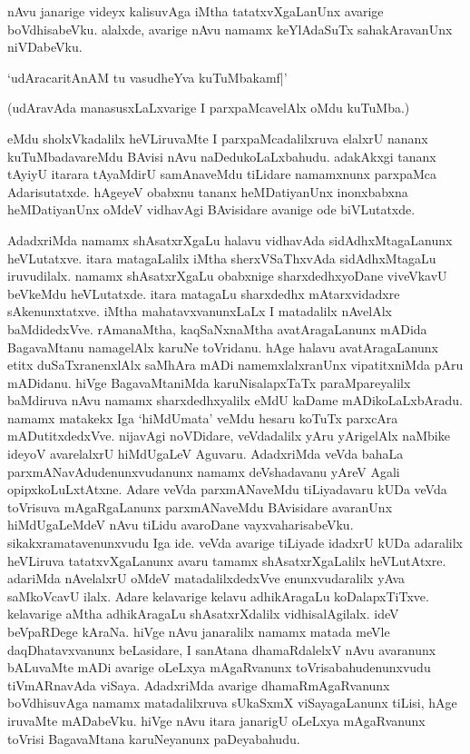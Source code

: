 nAvu janarige videyx kalisuvAga iMtha tatatxvXgaLanUnx avarige boVdhisabeVku. alalxde, avarige nAvu namamx keYlAdaSuTx sahakAravanUnx niVDabeVku.

\begin{shloka}
`udAracaritAnAM tu vasudheYva kuTuMbakamf|'
\end{shloka}

(udAravAda manasusxLaLxvarige I parxpaMcavelAlx oMdu kuTuMba.)

eMdu sholxVkadalilx heVLiruvaMte I parxpaMcadalilxruva elalxrU nananx kuTuMbadavareMdu BAvisi nAvu naDedukoLaLxbahudu. adakAkxgi tananx tAyiyU itarara tAyaMdirU samAnaveMdu tiLidare namamxnunx parxpaMca Adarisutatxde. hAgeyeV obabxnu tananx heMDatiyanUnx inonxbabxna heMDatiyanUnx oMdeV vidhavAgi BAvisidare avanige ode biVLutatxde.

AdadxriMda namamx shAsatxrXgaLu halavu vidhavAda sidAdhxMtagaLanunx heVLutatxve. itara matagaLalilx iMtha sherxVSaThxvAda sidAdhxMtagaLu iruvudilalx. namamx shAsatxrXgaLu obabxnige sharxdedhxyoDane viveVkavU beVkeMdu heVLutatxde. itara matagaLu sharxdedhx mAtarxvidadxre sAkenunxtatxve. iMtha mahatavxvanunxLaLx I matadalilx nAvelAlx baMdidedxVve. rAmanaMtha, kaqSaNxnaMtha avatAragaLanunx mADida BagavaMtanu namagelAlx karuNe toVridanu. hAge halavu avatAragaLanunx etitx duSaTxranenxlAlx saMhAra mADi namemxlalxranUnx 
vipatitxniMda pAru mADidanu. hiVge BagavaMtaniMda karuNisalapxTaTx paraMpareyalilx baMdiruva nAvu namamx sharxdedhxyalilx eMdU kaDame mADikoLaLxbAradu. namamx matakekx Iga `hiMdUmata' veMdu hesaru koTuTx parxcAra mADutitxdedxVve. nijavAgi noVDidare, veVdadalilx yAru yArigelAlx naMbike ideyoV avarelalxrU hiMdUgaLeV Aguvaru. AdadxriMda veVda bahaLa parxmANavAdudenunxvudanunx namamx deVshadavanu yAreV Agali opipxkoLuLxtAtxne. Adare veVda parxmANaveMdu tiLiyadavaru kUDa veVda toVrisuva mAgaRgaLanunx parxmANaveMdu BAvisidare 
avaranUnx hiMdUgaLeMdeV nAvu tiLidu avaroDane vayxvaharisabeVku. sikakxramatavenunxvudu Iga ide. veVda avarige tiLiyade idadxrU kUDa adaralilx heVLiruva tatatxvXgaLanunx avaru tamamx shAsatxrXgaLalilx heVLutAtxre. adariMda nAvelalxrU oMdeV matadalilxdedxVve enunxvudaralilx yAva saMkoVcavU ilalx. Adare kelavarige kelavu adhikAragaLu koDalapxTiTxve. kelavarige aMtha adhikAragaLu shAsatxrXdalilx vidhisalAgilalx. ideV beVpaRDege kAraNa. hiVge nAvu janaralilx namamx matada meVle daqDhatavxvanunx beLasidare, I sanAtana 
dhamaRdalelxV nAvu avaranunx bALuvaMte mADi avarige oLeLxya mAgaRvanunx toVrisabahudenunxvudu tiVmARnavAda viSaya. AdadxriMda avarige dhamaRmAgaRvanunx boVdhisuvAga namamx matadalilxruva sUkaSxmX viSayagaLanunx tiLisi, hAge iruvaMte mADabeVku. hiVge nAvu itara janarigU oLeLxya mAgaRvanunx toVrisi BagavaMtana karuNeyanunx paDeyabahudu.


\endchapter
